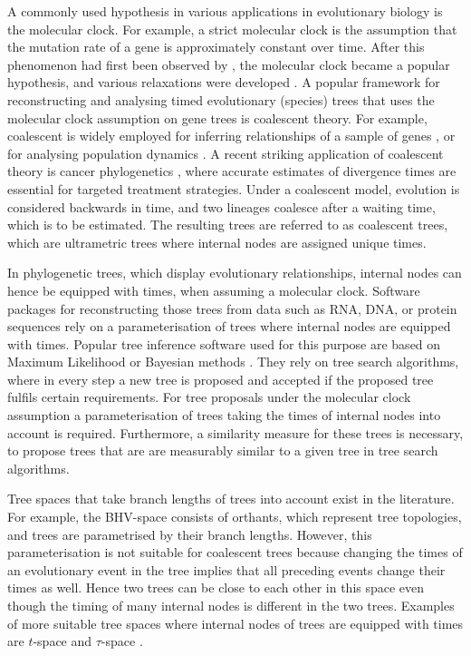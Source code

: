 \documentclass[11pt]{amsart}
\newcommand{\summary}[1]{} %
\begin{document}
\summary{Molecular clock, divergence dating, and coalescent -- biological motivation}
A commonly used hypothesis in various applications in evolutionary biology is the molecular clock.
For example, a strict molecular clock is the assumption that the mutation rate of a gene is approximately constant over time.
After this phenomenon had first been observed by \textcite{zuckerkandl1965evolutionary}, the molecular clock became a popular hypothesis, and various relaxations were developed \autocite{Kumar2016-eu}.
A popular framework for reconstructing and analysing timed evolutionary (species) trees \autocite{Kingman1982-df} that uses the molecular clock assumption on gene trees is coalescent theory.
For example, coalescent is widely employed for inferring relationships of a sample of genes \autocite{Hudson1990-ki, Kuhner2009-jb}, or for analysing population dynamics \autocite{Kuhner1998-eh,Drummond2005-ak}.
A recent striking application of coalescent theory is cancer phylogenetics \autocite{Posada2020-aa, Ohtsuki2017-su}, where accurate estimates of divergence times are essential for targeted treatment strategies.
Under a coalescent model, evolution is considered backwards in time, and two lineages coalesce after a waiting time, which is to be estimated.
The resulting trees are referred to as coalescent trees, which are ultrametric trees where internal nodes are assigned unique times.

\summary{Software needs to deal with clock trees, tree proposals}
In phylogenetic trees, which display evolutionary relationships, internal nodes can hence be equipped with times, when assuming a molecular clock.
Software packages for reconstructing those trees from data such as RNA, DNA, or protein sequences rely on a parameterisation of trees where internal nodes are equipped with times.
Popular tree inference software used for this purpose are based on Maximum Likelihood \autocite{Kozlov2019-cf, Nguyen2015-sp, Tamura2011-ky} or Bayesian methods \autocite{Bouckaert2014-ir,Suchard2018-tw, Ronquist2003-eq}.
They rely on tree search algorithms, where in every step a new tree is proposed and accepted if the proposed tree fulfils certain requirements.
For tree proposals under the molecular clock assumption a parameterisation of trees taking the times of internal nodes into account is required.
Furthermore, a similarity measure for these trees is necessary, to propose trees that are are measurably similar to a given tree in tree search algorithms.

\summary{Known tree spaces -- BHV, $t$-space and $\tau$-space}
Tree spaces that take branch lengths of trees into account exist in the literature.
For example, the BHV-space \autocite{Billera2001-rj} consists of orthants, which represent tree topologies, and trees are parametrised by their branch lengths.
However, this parameterisation is not suitable for coalescent trees because changing the times of an evolutionary event in the tree implies that all preceding events change their times as well.
Hence two trees can be close to each other in this space even though the timing of many internal nodes is different in the two trees.
Examples of more suitable tree spaces where internal nodes of trees are equipped with times are $t$-space and $\tau$-space \autocite{Gavryushkin2016-uu}.
\end{document}
